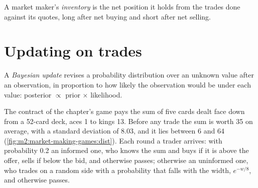 \begin{definition}[Inventory]\label{def:m2:market-making-games:inv}
A market maker's \emph{inventory} is the net position it holds from the
trades done against its quotes, long after net buying and short after net selling.
\end{definition}

\section{Updating on trades}

\begin{definition}\label{def:m2:market-making-games:bayes}
A \emph{Bayesian update} revises a probability distribution over an
unknown value after an observation, in proportion to how likely the observation would be
under each value: posterior $\propto$ prior $\times$ likelihood.
\end{definition}

The contract of the chapter's game pays the sum of five cards dealt face down from a
52-card deck, aces 1 to kings 13. Before any trade the sum is worth 35 on average, with a
standard deviation of 8.03, and it lies between 6 and 64
(\cref{fig:m2:market-making-games:dist}). Each round a trader arrives: with probability
0.2 an informed one, who knows the sum and buys if it is above the offer, sells if below
the bid, and otherwise passes; otherwise an uninformed one, who trades on a random side
with a probability that falls with the width, $e^{-w/8}$, and otherwise passes.

\begin{omfigure}

\label{fig:m2:market-making-games:dist}
\end{omfigure}

